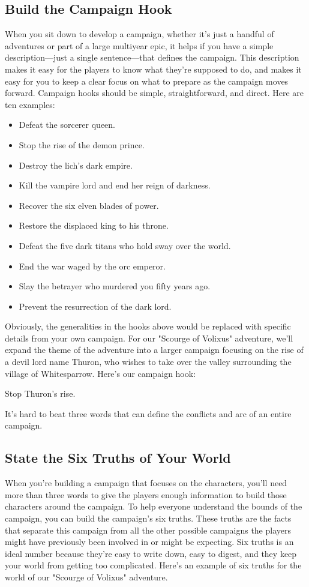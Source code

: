 \documentclass[10pt,a4paper,twoside,bg=print,twocolumn,openany,nodeprecatedcode]{dndbook}
\begin{document}
\subsection{Build the Campaign Hook}
When you sit down to develop a campaign, whether it's just a handful of adventures or part of a large multiyear epic, it helps if you have a simple description—just a single sentence—that defines the campaign. This description makes it easy for the players to know what they're supposed to do, and makes it easy for you to keep a clear focus on what to prepare as the campaign moves forward.
Campaign hooks should be simple, straightforward, and direct. Here are ten examples:

\begin{itemize}
\item Defeat the sorcerer queen.
\item Stop the rise of the demon prince.
\item Destroy the lich's dark empire.
\item Kill the vampire lord and end her reign of darkness.
\item Recover the six elven blades of power.
\item Restore the displaced king to his throne.
\item Defeat the five dark titans who hold sway over the world.
\item End the war waged by the orc emperor.
\item Slay the betrayer who murdered you fifty years ago.
\item Prevent the resurrection of the dark lord.
\end{itemize}

Obviously, the generalities in the hooks above would be replaced with specific details from your own campaign. For our "Scourge of Volixus" adventure, we'll expand the theme of the adventure into a larger campaign focusing on the rise of a devil lord name Thuron, who wishes to take over the valley surrounding the village of Whitesparrow. Here's our campaign hook:
\begin{DndSidebar}[float=!b]{}
Stop Thuron's rise.


\end{DndSidebar}

It's hard to beat three words that can define the conflicts and arc of an entire campaign.
\subsection{State the Six Truths of Your World}
When you're building a campaign that focuses on the characters, you'll need more than three words to give the players enough information to build those characters around the campaign. To help everyone understand the bounds of the campaign, you can build the campaign's six truths.
These truths are the facts that separate this campaign from all the other possible campaigns the players might have previously been involved in or might be expecting. Six truths is an ideal number because they're easy to write down, easy to digest, and they keep your world from getting too complicated.
Here's an example of six truths for the world of our "Scourge of Volixus" adventure.
\end{document}
